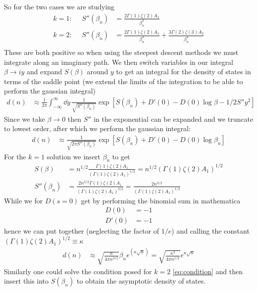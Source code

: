 \documentclass[a4paper,12pt]{article}
\begin{document}
So for the two cases we are studying 
\begin{equation}
	\begin{aligned}
	k=1:~~~~~~	S''(\beta_n)&=
		\frac{2\Gamma(1)\zeta(2)A_1}{\beta_n^{3}}\\
	k=2:~~~~~~S''(\beta_n)&=
	\frac{2\Gamma(1)\zeta(2)A_1}{\beta_n^{3}}+\frac{3\Gamma(2)\zeta(3)A_2}{\beta_n^{4}}\\
	\end{aligned}
\end{equation}
These are both positive so when using the steepest descent methods we must integrate along an imaginary path. We then switch variables in our integral $\beta\to iy$ and expand $S(\beta)$ around $y$ to get an integral for the density of states in terms of the saddle point (we extend the limits of the integration to be able to perform the gaussian integral)
\begin{equation}
	\begin{aligned}
		d(n)&\approx\frac{1}{2\pi }\int_{-\infty}^{\infty}\dd y\,\frac{1}{\sqrt{S''(\beta_n)}}\exp[S(\beta_n)+D'(0)-D(0)\log \beta-1/2 S''y^2]
	\end{aligned}
\end{equation}
Since we take $\beta\to 0$ then $S''$ in the exponential can be expanded and we truncate to lowest order, after which we perform the gaussian integral:
\begin{equation}
	\begin{aligned}
	d(n)&\approx\frac{1}{\sqrt{2\pi S''(\beta_n)}}\exp[S(\beta_n)+D'(0)-D(0)\log \beta_n]
	\end{aligned}
\end{equation}
For the $k=1$ solution we insert $\beta_n$ to get 
\begin{equation}
	\begin{aligned}
			S(\beta)&=n^{1/2}
		\frac{\Gamma(1)\zeta(2)A_1}{(\Gamma(1)\zeta(2)A_1)^{1/2}}=n^{1/2}
		(\Gamma(1)\zeta(2)A_1)^{1/2}\\
		S''(\beta_n)&=
		\frac{2n^{3/2}\Gamma(1)\zeta(2)A_1}{(\Gamma(1)\zeta(2)A_1)^{3/2}}=
		\frac{2n^{3/2}}{(\Gamma(1)\zeta(2)A_1)^{1/2}}
	\end{aligned}
\end{equation}
While we for $D(s=0)$ get by performing the binomial sum in mathematica
\begin{equation}
	\begin{aligned}
		D(0)&=-1\\
		D'(0)&=-1
	\end{aligned}
\end{equation}
hence we can put together (neglecting the factor of $1/e$) and calling the constant $(\Gamma(1)\zeta(2)A_1)^{1/2}\equiv\kappa$
\begin{equation}
	\begin{aligned}
		d(n)&\approx\sqrt{\frac{\kappa}{4\pi n^{3/2}}}\beta_n e^{(\kappa \sqrt{n})}=
		\sqrt{\frac{\kappa^2}{4\pi n^{1/2}}} e^{\kappa \sqrt{n}}
	\end{aligned}
\end{equation}
Similarly one could solve the condition posed for $k=2$ \eqref{eq:condition} and then insert this into $S(\beta_n)$ to obtain the asymptotic density of states.
\end{document}
